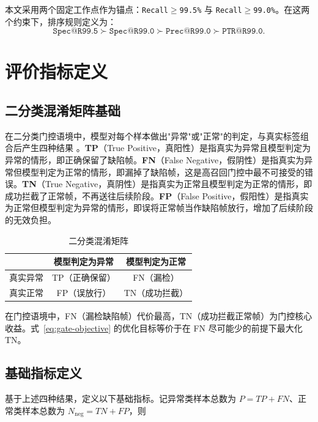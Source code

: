 \documentclass[UTF8,openany,12pt]{ctexbook}
\newcommand{\formalmetric}[1]{\texttt{#1}}
\begin{document}
本文采用两个固定工作点作为锚点：\formalmetric{Recall$\geq$99.5\%} 与 \formalmetric{Recall$\geq$99.0\%}。在这两个约束下，排序规则定义为：
\begin{equation}
\formalmetric{Spec@R99.5} \succ \formalmetric{Spec@R99.0} \succ \formalmetric{Prec@R99.0} \succ \formalmetric{PTR@R99.0}.
\end{equation}

\section{评价指标定义}

\subsection{二分类混淆矩阵基础}
在二分类门控语境中，模型对每个样本做出"异常"或"正常"的判定，与真实标签组合后产生四种结果 \cite{goodfellow2016deep}。\textbf{TP}（True Positive，真阳性）是指真实为异常且模型判定为异常的情形，即正确保留了缺陷帧。\textbf{FN}（False Negative，假阴性）是指真实为异常但模型判定为正常的情形，即漏掉了缺陷帧，这是高召回门控中最不可接受的错误。\textbf{TN}（True Negative，真阴性）是指真实为正常且模型判定为正常的情形，即成功拦截了正常帧，不再送往后续阶段。\textbf{FP}（False Positive，假阳性）是指真实为正常但模型判定为异常的情形，即误将正常帧当作缺陷帧放行，增加了后续阶段的无效负担。

\begin{table}[H]
    \centering
    \caption{二分类混淆矩阵}
    \label{tab:confusion-matrix}
    \begin{tabular}{lcc}
        \toprule
         & 模型判定为异常 & 模型判定为正常 \\
        \midrule
        真实异常 & TP（正确保留） & FN（漏检） \\
        真实正常 & FP（误放行） & TN（成功拦截） \\
        \bottomrule
    \end{tabular}
\end{table}

\noindent 在门控语境中，FN（漏检缺陷帧）代价最高，TN（成功拦截正常帧）为门控核心收益。式~\eqref{eq:gate-objective} 的优化目标等价于在 FN 尽可能少的前提下最大化 TN。

\subsection{基础指标定义}
基于上述四种结果，定义以下基础指标。记异常类样本总数为 $P = TP + FN$、正常类样本总数为 $N_{\mathrm{neg}} = TN + FP$，则
\end{document}
